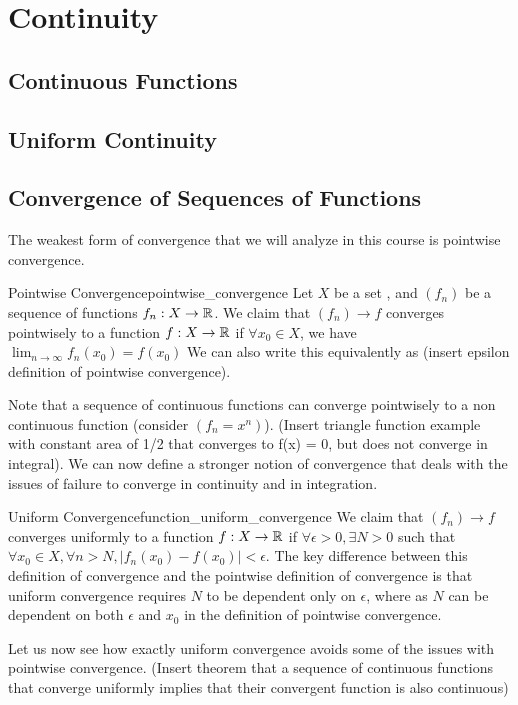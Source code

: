 \section{Continuity}
\subsection{Continuous Functions}
\subsection{Uniform Continuity}
\subsection{Convergence of Sequences of Functions}
The weakest form of convergence that we will analyze in this course is pointwise convergence.
\begin{defn}{Pointwise Convergence}{pointwise_convergence}
Let \(X\) be a set , and \((f_n)\) be a sequence of functions \(f_n: X \to {\mathbb R}\). We claim that \((f_n) \to f\) converges pointwisely to a function \(f: X \to {\mathbb R}\) if \(\forall x_0 \in X\), we have \(\lim_{n \to \infty} f_n(x_0) = f(x_0)\) We can also write this equivalently as (insert epsilon definition of pointwise convergence).
\end{defn}
Note that a sequence of continuous functions can converge pointwisely to a non continuous function (consider \((f_n = x^n)\)). (Insert triangle function example with constant area of 1/2 that converges to f(x) = 0, but does not converge in integral). We can now define a stronger notion of convergence that deals with the issues of failure to converge in continuity and in integration. 
\begin{defn}{Uniform Convergence}{function_uniform_convergence}
We claim that \((f_n) \to f\) converges uniformly to a function \(f: X \to {\mathbb R}\) if \(\forall \epsilon > 0,\exists N > 0\) such that \(\forall x_0 \in X,\forall n > N, |f_n(x_0) - f(x_0)| < \epsilon\). The key difference between this definition of convergence and the pointwise definition of convergence is that uniform convergence requires \(N\) to be dependent only on \(\epsilon\), where as \(N\) can be dependent on both \(\epsilon\) and \(x_0\) in the definition of pointwise convergence.
\end{defn}
Let us now see how exactly uniform convergence avoids some of the issues with pointwise convergence.
(Insert theorem that a sequence of continuous functions that converge uniformly implies that their convergent function is also continuous)
